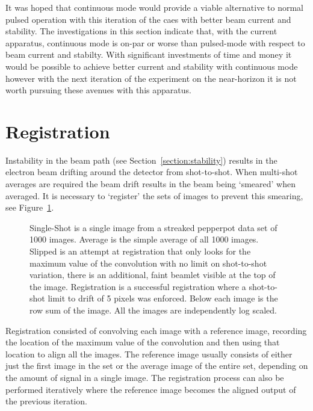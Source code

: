 It was hoped that continuous mode would provide a viable alternative to normal pulsed operation with this iteration of the \gls{caes} with better beam current and stability.
The investigations in this section indicate that, with the current apparatus, continuous mode is on-par or worse than pulsed-mode with respect to beam current and stabilty.
With significant investments of time and money it would be possible to achieve better current and stability with continuous mode however with the next iteration of the experiment on the near-horizon it is not worth pursuing these avenues with this apparatus.

\section{Registration}\label{section:registration}

Instability in the beam path (see Section~\ref{section:stability}) results in the electron beam drifting around the detector from shot-to-shot.
When multi-shot averages are required the beam drift results in the beam being `smeared' when averaged.
It is necessary to `register' the sets of images to prevent this smearing, see Figure~\ref{figure:registration_examples}.

\begin{figure}
    \center
    
    \caption{Single-Shot is a single image from a streaked pepperpot data set of 1000 images. Average is the simple average of all 1000 images. Slipped is an attempt at registration that only looks for the maximum value of the convolution with no limit on shot-to-shot variation, there is an additional, faint beamlet visible at the top of the image. Registration is a successful registration where a shot-to-shot limit to drift of 5 pixels was enforced. Below each image is the row sum of the image. All the images are independently log scaled.}
    \label{figure:registration_examples}
\end{figure}

Registration consisted of convolving each image with a reference image, recording the location of the maximum value of the convolution and then using that location to align all the images.
The reference image usually consists of either just the first image in the set or the average image of the entire set, depending on the amount of signal in a single image.
The registration process can also be performed iteratively where the reference image becomes the aligned output of the previous iteration.

